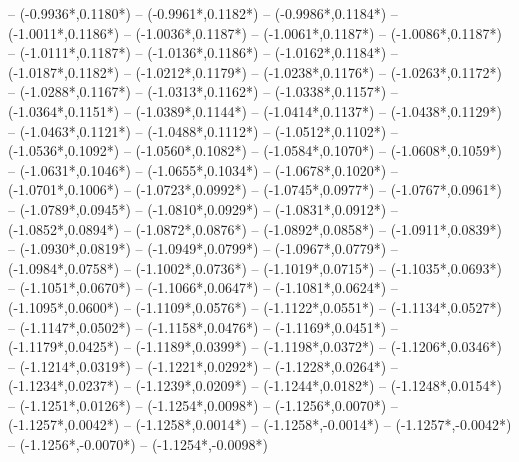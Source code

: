 {	-- ({-0.9936*\dx},{0.1180*\dy})
	-- ({-0.9961*\dx},{0.1182*\dy})
	-- ({-0.9986*\dx},{0.1184*\dy})
	-- ({-1.0011*\dx},{0.1186*\dy})
	-- ({-1.0036*\dx},{0.1187*\dy})
	-- ({-1.0061*\dx},{0.1187*\dy})
	-- ({-1.0086*\dx},{0.1187*\dy})
	-- ({-1.0111*\dx},{0.1187*\dy})
	-- ({-1.0136*\dx},{0.1186*\dy})
	-- ({-1.0162*\dx},{0.1184*\dy})
	-- ({-1.0187*\dx},{0.1182*\dy})
	-- ({-1.0212*\dx},{0.1179*\dy})
	-- ({-1.0238*\dx},{0.1176*\dy})
	-- ({-1.0263*\dx},{0.1172*\dy})
	-- ({-1.0288*\dx},{0.1167*\dy})
	-- ({-1.0313*\dx},{0.1162*\dy})
	-- ({-1.0338*\dx},{0.1157*\dy})
	-- ({-1.0364*\dx},{0.1151*\dy})
	-- ({-1.0389*\dx},{0.1144*\dy})
	-- ({-1.0414*\dx},{0.1137*\dy})
	-- ({-1.0438*\dx},{0.1129*\dy})
	-- ({-1.0463*\dx},{0.1121*\dy})
	-- ({-1.0488*\dx},{0.1112*\dy})
	-- ({-1.0512*\dx},{0.1102*\dy})
	-- ({-1.0536*\dx},{0.1092*\dy})
	-- ({-1.0560*\dx},{0.1082*\dy})
	-- ({-1.0584*\dx},{0.1070*\dy})
	-- ({-1.0608*\dx},{0.1059*\dy})
	-- ({-1.0631*\dx},{0.1046*\dy})
	-- ({-1.0655*\dx},{0.1034*\dy})
	-- ({-1.0678*\dx},{0.1020*\dy})
	-- ({-1.0701*\dx},{0.1006*\dy})
	-- ({-1.0723*\dx},{0.0992*\dy})
	-- ({-1.0745*\dx},{0.0977*\dy})
	-- ({-1.0767*\dx},{0.0961*\dy})
	-- ({-1.0789*\dx},{0.0945*\dy})
	-- ({-1.0810*\dx},{0.0929*\dy})
	-- ({-1.0831*\dx},{0.0912*\dy})
	-- ({-1.0852*\dx},{0.0894*\dy})
	-- ({-1.0872*\dx},{0.0876*\dy})
	-- ({-1.0892*\dx},{0.0858*\dy})
	-- ({-1.0911*\dx},{0.0839*\dy})
	-- ({-1.0930*\dx},{0.0819*\dy})
	-- ({-1.0949*\dx},{0.0799*\dy})
	-- ({-1.0967*\dx},{0.0779*\dy})
	-- ({-1.0984*\dx},{0.0758*\dy})
	-- ({-1.1002*\dx},{0.0736*\dy})
	-- ({-1.1019*\dx},{0.0715*\dy})
	-- ({-1.1035*\dx},{0.0693*\dy})
	-- ({-1.1051*\dx},{0.0670*\dy})
	-- ({-1.1066*\dx},{0.0647*\dy})
	-- ({-1.1081*\dx},{0.0624*\dy})
	-- ({-1.1095*\dx},{0.0600*\dy})
	-- ({-1.1109*\dx},{0.0576*\dy})
	-- ({-1.1122*\dx},{0.0551*\dy})
	-- ({-1.1134*\dx},{0.0527*\dy})
	-- ({-1.1147*\dx},{0.0502*\dy})
	-- ({-1.1158*\dx},{0.0476*\dy})
	-- ({-1.1169*\dx},{0.0451*\dy})
	-- ({-1.1179*\dx},{0.0425*\dy})
	-- ({-1.1189*\dx},{0.0399*\dy})
	-- ({-1.1198*\dx},{0.0372*\dy})
	-- ({-1.1206*\dx},{0.0346*\dy})
	-- ({-1.1214*\dx},{0.0319*\dy})
	-- ({-1.1221*\dx},{0.0292*\dy})
	-- ({-1.1228*\dx},{0.0264*\dy})
	-- ({-1.1234*\dx},{0.0237*\dy})
	-- ({-1.1239*\dx},{0.0209*\dy})
	-- ({-1.1244*\dx},{0.0182*\dy})
	-- ({-1.1248*\dx},{0.0154*\dy})
	-- ({-1.1251*\dx},{0.0126*\dy})
	-- ({-1.1254*\dx},{0.0098*\dy})
	-- ({-1.1256*\dx},{0.0070*\dy})
	-- ({-1.1257*\dx},{0.0042*\dy})
	-- ({-1.1258*\dx},{0.0014*\dy})
	-- ({-1.1258*\dx},{-0.0014*\dy})
	-- ({-1.1257*\dx},{-0.0042*\dy})
	-- ({-1.1256*\dx},{-0.0070*\dy})
	-- ({-1.1254*\dx},{-0.0098*\dy})
}

